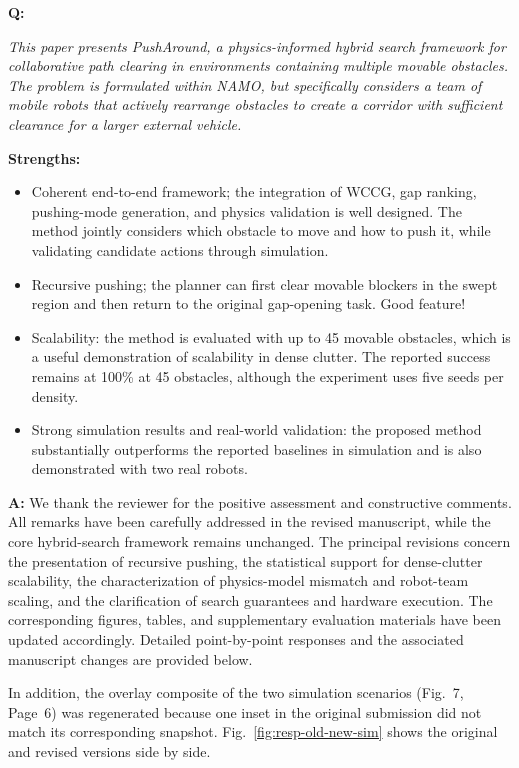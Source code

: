 \documentclass[11pt]{article}
\begin{document}
\begin{shaded*}
\noindent \textbf{Q:}
{\itshape
This paper presents PushAround, a physics-informed hybrid search
framework for collaborative path clearing in environments containing
multiple movable obstacles. The problem is formulated within NAMO, but
specifically considers a team of mobile robots that actively rearrange
obstacles to create a corridor with sufficient clearance for a larger
external vehicle.

\textbf{Strengths:}
\begin{itemize}
\item Coherent end-to-end framework; the integration of WCCG, gap ranking,
pushing-mode generation, and physics validation is well designed. The method
jointly considers which obstacle to move and how to push it, while validating
candidate actions through simulation.
\item Recursive pushing; the planner can first clear movable blockers in the swept
region and then return to the original gap-opening task. Good feature!
\item Scalability: the method is evaluated with up to 45 movable obstacles, which
is a useful demonstration of scalability in dense clutter. The reported success
remains at 100\% at 45 obstacles, although the experiment uses five seeds per
density.
\item Strong simulation results and real-world validation: the proposed method
substantially outperforms the reported baselines in simulation and is also
demonstrated with two real robots.
\end{itemize}
}
\end{shaded*}

\noindent \textbf{A:}
We thank the reviewer for the positive assessment and constructive comments.
All remarks have been carefully addressed in the revised manuscript, while the
core hybrid-search framework remains unchanged. The principal revisions concern
the presentation of recursive pushing, the statistical support for dense-clutter
scalability, the characterization of physics-model mismatch and robot-team scaling,
and the clarification of search guarantees and hardware execution. The corresponding
figures, tables, and supplementary evaluation materials have been updated accordingly.
Detailed point-by-point responses and the associated manuscript changes are provided
below.

In addition, the overlay composite of the two simulation scenarios
(Fig.~7, Page~6) was regenerated because one inset in the original submission did
not match its corresponding snapshot. Fig.~\ref{fig:resp-old-new-sim} shows the
original and revised versions side by side.
\end{document}

